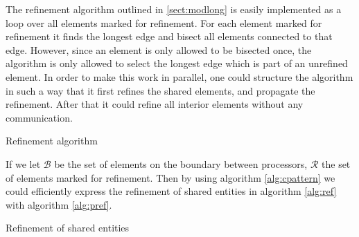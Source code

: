 
The refinement algorithm outlined in \ref{sect:modlong} is easily
implemented as a loop over all elements marked for refinement. For
each element marked for refinement it finds the longest edge and
bisect all elements connected to that edge. However, since an element
is only allowed to be bisected once, the algorithm is only allowed to
select the longest edge which is part of an unrefined element. In
order to make this work in parallel, one could structure the algorithm
in such a way that it first refines the shared elements, and propagate
the refinement. After that it could refine all interior elements
without any communication.
\begin{algorithm}
  \caption{Refinement algorithm}
  \label{alg:ref}
\end{algorithm}


If we let $\mathcal{B}$ be the set of elements on the boundary between
processors, $\mathcal{R}$ the set of elements marked for
refinement. Then by using algorithm \ref{alg:cpattern} we could
efficiently express the refinement of shared entities in algorithm
\ref{alg:ref} with algorithm \ref{alg:pref}.
\begin{algorithm}
  \caption{Refinement of shared entities}
  \label{alg:pref}
\end{algorithm}

